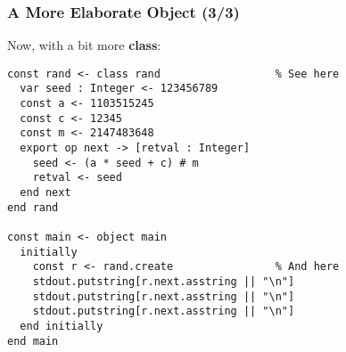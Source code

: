 \begin{frame}[fragile]

\frametitle{A More Elaborate Object (3/3)}

Now, with a bit more \textbf{class}:

\begin{lstlisting}
const rand <- class rand                  % See here
  var seed : Integer <- 123456789
  const a <- 1103515245
  const c <- 12345
  const m <- 2147483648
  export op next -> [retval : Integer]
    seed <- (a * seed + c) # m
    retval <- seed
  end next
end rand

const main <- object main
  initially
    const r <- rand.create                % And here
    stdout.putstring[r.next.asstring || "\n"]
    stdout.putstring[r.next.asstring || "\n"]
    stdout.putstring[r.next.asstring || "\n"]
  end initially
end main
\end{lstlisting}

\end{frame}
